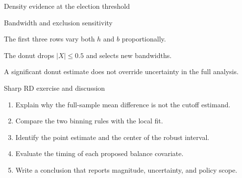 \begin{frame}{Density evidence at the election threshold}
\end{frame}

\begin{frame}{Bandwidth and exclusion sensitivity}

\begin{items}
\item The first three rows vary both $h$ and $b$ proportionally.
\item The donut drops $|X|\leq0.5$ and selects new bandwidths.
\item A significant donut estimate does not override uncertainty in the full analysis.
\end{items}
\end{frame}

\begin{frame}{Sharp RD exercise and discussion}
\begin{enumerate}\setlength{\itemsep}{.6em}
\item Explain why the full-sample mean difference is not the cutoff estimand.
\item Compare the two binning rules with the local fit.
\item Identify the point estimate and the center of the robust interval.
\item Evaluate the timing of each proposed balance covariate.
\item Write a conclusion that reports magnitude, uncertainty, and policy scope.
\end{enumerate}
\end{frame}
